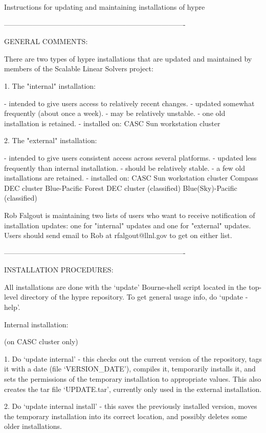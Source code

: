     Instructions for updating and maintaining installations of hypre

----------------------------------------------------------------------------

GENERAL COMMENTS:

There are two types of hypre installations that are updated and
maintained by members of the Scalable Linear Solvers project:

  1. The "internal" installation:

    - intended to give users access to relatively recent changes.
    - updated somewhat frequently (about once a week).
    - may be relatively unstable.
    - one old installation is retained.
    - installed on:
        CASC Sun workstation cluster

  2. The "external" installation:

    - intended to give users consistent access across several platforms.
    - updated less frequently than internal installation.
    - should be relatively stable.
    - a few old installations are retained.
    - installed on:
        CASC Sun workstation cluster
        Compass DEC cluster
        Blue-Pacific
        Forest DEC cluster  (classified)
        Blue(Sky)-Pacific   (classified)

Rob Falgout is maintaining two lists of users who want to receive
notification of installation updates: one for "internal" updates and
one for "external" updates.  Users should send email to Rob at
rfalgout@llnl.gov to get on either list.

----------------------------------------------------------------------------

INSTALLATION PROCEDURES:

All installations are done with the `update' Bourne-shell script
located in the top-level directory of the hypre repository.  To
get general usage info, do `update -help'.

Internal installation:

  (on CASC cluster only)

  1. Do `update internal' - this checks out the current version of the
     repository, tags it with a date (file `VERSION_DATE'), compiles it,
     temporarily installs it, and sets the permissions of the temporary
     installation to appropriate values.  This also creates the tar file
     `UPDATE.tar', currently only used in the external installation.

  2. Do `update internal install' - this saves the previously
     installed version, moves the temporary installation into its
     correct location, and possibly deletes some older installations.

